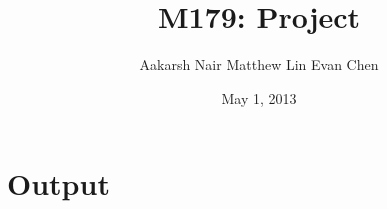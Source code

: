 \documentclass[10pt]{scrartcl}
\begin{document}
\title{M179: Project}
\author{Aakarsh Nair \quad Matthew Lin \quad Evan Chen}
\date{May 1, 2013}
\maketitle

\section{Output}
\begin{centering}
	\begin{tabular}{l|l|l}
		
	\end{tabular}
\end{centering}
\end{document}
